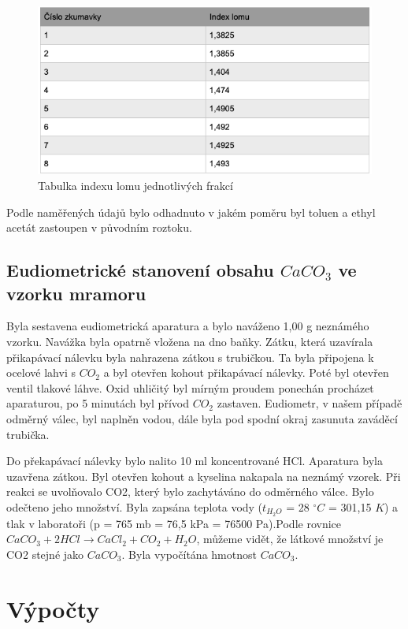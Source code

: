 \documentclass[13pt, a4paper, twoside]{article}z
\begin{document}
\begin{figure}[H]
    \centering
    \includegraphics[width=6.5in]{uloha_8_tab_3.png}
    \caption*{Tabulka indexu lomu jednotlivých frakcí}
\end{figure}

Podle naměřených údajů bylo odhadnuto v jakém poměru byl toluen a ethyl acetát zastoupen v původním roztoku.

\subsection*{Eudiometrické stanovení obsahu $CaCO_3$ ve vzorku mramoru}
Byla sestavena eudiometrická aparatura  a bylo naváženo 1,00 g neznámého vzorku. Navážka byla opatrně vložena na dno baňky. Zátku, která uzavírala přikapávací nálevku byla nahrazena zátkou s trubičkou. Ta byla připojena k ocelové lahvi s $CO_2$ a byl otevřen kohout přikapávací nálevky. Poté byl otevřen ventil tlakové láhve. Oxid uhličitý byl mírným proudem ponechán procházet aparaturou, po 5 minutách byl přívod $CO_2$ zastaven. Eudiometr, v našem případě odměrný válec, byl naplněn vodou, dále byla pod spodní okraj zasunuta zaváděcí trubička.


Do překapávací nálevky bylo nalito 10 ml koncentrované HCl. Aparatura byla uzavřena zátkou. Byl otevřen kohout a kyselina nakapala na neznámý vzorek. Při reakci se uvolňovalo CO2, který bylo zachytáváno do odměrného válce. Bylo odečteno jeho množství. Byla zapsána teplota vody ($t_{H_2O}$ = 28 $^{\circ}C$ = 301,15 $K$) a tlak v laboratoři (p = 765 mb = 76,5 kPa = 76500 Pa).Podle rovnice $CaCO_3 + 2HCl \to CaCl_2 + CO_2 + H_2O$, můžeme vidět, že látkové množství je CO2 stejné jako $CaCO_3$. Byla vypočítána hmotnost $CaCO_3$.

\section*{Výpočty}
\end{document}
